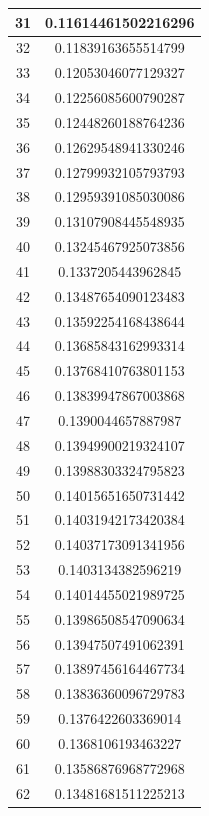 \documentclass{article}
\begin{document}
\begin{longtable}{|c|c|}
    \hline
    31 & 0.11614461502216296 \\
    \hline
    32 & 0.11839163655514799 \\
    \hline
    33 & 0.12053046077129327 \\
    \hline
    34 & 0.12256085600790287 \\
    \hline
    35 & 0.12448260188764236 \\
    \hline
    36 & 0.12629548941330246 \\
    \hline
    37 & 0.12799932105793793 \\
    \hline
    38 & 0.12959391085030086 \\
    \hline
    39 & 0.13107908445548935 \\
    \hline
    40 & 0.13245467925073856 \\
    \hline
    41 & 0.1337205443962845 \\
    \hline
    42 & 0.13487654090123483 \\
    \hline
    43 & 0.13592254168438644 \\
    \hline
    44 & 0.13685843162993314 \\
    \hline
    45 & 0.13768410763801153 \\
    \hline
    46 & 0.13839947867003868 \\
    \hline
    47 & 0.1390044657887987 \\
    \hline
    48 & 0.13949900219324107 \\
    \hline
    49 & 0.13988303324795823 \\
    \hline
    50 & 0.14015651650731442 \\
    \hline
    51 & 0.14031942173420384 \\
    \hline
    52 & 0.14037173091341956 \\
    \hline
    53 & 0.1403134382596219 \\
    \hline
    54 & 0.14014455021989725 \\
    \hline
    55 & 0.13986508547090634 \\
    \hline
    56 & 0.13947507491062391 \\
    \hline
    57 & 0.13897456164467734 \\
    \hline
    58 & 0.13836360096729783 \\
    \hline
    59 & 0.1376422603369014 \\
    \hline
    60 & 0.1368106193463227 \\
    \hline
    61 & 0.13586876968772968 \\
    \hline
    62 & 0.13481681511225213 \\

\end{longtable}
\end{document}
